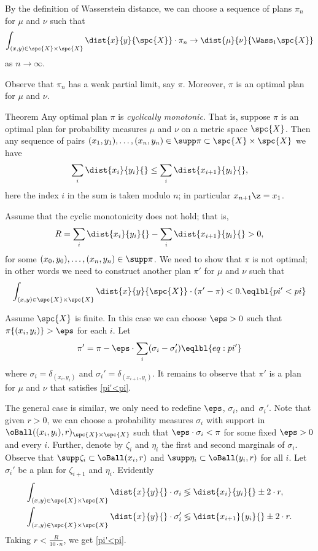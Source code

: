By the definition of Wasserstein distance, we can choose a sequence of plans $\pi_n$ for $\mu$ and $\nu$ such that 
\[\int_{(x,y)\in\spc{X}\times\spc{X}}\dist{x}{y}{\spc{X}}\cdot\pi_n\to \dist{\mu}{\nu}{\Wass_1\spc{X}}\]
as $n\to \infty$.

Observe that $\pi_n$ has a weak partial limit, say $\pi$.
Moreover, $\pi$ is an optimal plan for $\mu$ and $\nu$.
\qeds

\begin{thm}{Theorem}
Any optimal plan $\pi$ is \emph{cyclically monotonic}.
That is, suppose $\pi$ is an optimal plan for probability measures $\mu$ and $\nu$ on a metric space $\spc{X}$.
Then any sequence of pairs $(x_1,y_1),\dots,(x_n,y_n)\in\supp\pi\subset\spc{X}\times\spc{X}$ we have
\[\sum_i\dist{x_i}{y_i}{}
\le
\sum_i\dist{x_{i+1}}{y_i}{},\]
here the index $i$ in the sum is taken modulo $n$; in particular $x_{n+1}\z=x_1$.
\end{thm}

Assume that the cyclic monotonicity does not hold;
that is,
\[R=\sum_i\dist{x_i}{y_i}{}
-
\sum_i\dist{x_{i+1}}{y_i}{}>0,\]
for some $(x_0,y_0),\dots,(x_n,y_n)\in\supp\pi$.
We need to show that $\pi$ is not optimal;
in other words we need to construct another plan $\pi'$ for $\mu$ and $\nu$ such that 
\[\int_{(x,y)\in\spc{X}\times\spc{X}}\dist{x}{y}{\spc{X}}\cdot(\pi'-\pi)<0.\eqlbl{pi'<pi}\]

Assume $\spc{X}$ is finite.
In this case we can choose $\eps>0$ such that 
$\pi\{(x_i,y_i)\}>\eps$ for each $i$.
Let
\[\pi'=\pi-\eps\cdot\sum_i(\sigma_i-\sigma_i')\eqlbl{eq:pi'}\]
where $\sigma_i=\delta_{(x_i,y_i)}$ and $\sigma_i'=\delta_{(x_{i+1},y_i)}$.
It remains to observe that $\pi'$ is a plan for $\mu$ and $\nu$ that satisfies \ref{pi'<pi}.

The general case is similar, we only need to redefine $\eps$, $\sigma_i$, and~$\sigma_i'$.
Note that given $r>0$, we can choose a probability measures $\sigma_i$ with support in $\oBall((x_i,y_i),r)_{\spc{X}\times\spc{X}}$ such that $\eps\cdot \sigma_i<\pi$ for some fixed $\eps>0$ and every $i$.
Further, denote by $\zeta_i$ and $\eta_i$ the first and second marginals of $\sigma_i$.
Observe that $\supp\zeta_i\subset\oBall(x_i,r)$ and $\supp\eta_i\subset\oBall(y_i,r)$ for all $i$.
Let $\sigma_i'$ be a plan for $\zeta_{i+1}$ and $\eta_i$.
Evidently 
\begin{align*}
\int_{(x,y)\in\spc{X}\times\spc{X}}\dist{x}{y}{}\cdot \sigma_i
&\lessgtr
\dist{x_i}{y_i}{}\pm 2\cdot r,
\\
\int_{(x,y)\in\spc{X}\times\spc{X}}\dist{x}{y}{}\cdot \sigma_i'
&\lessgtr
\dist{x_{i+1}}{y_i}{}\pm 2\cdot r.
\end{align*}
Taking $r<\tfrac R{10\cdot n}$, we get  \ref{pi'<pi}. 
\qeds




